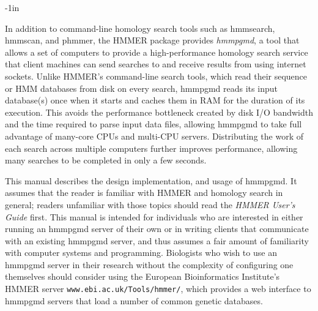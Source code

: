\documentclass[notoc]{tufte-book}    %
\begin{document}
\setcounter{tocdepth}{2}             %

\maketitle



\begin{adjustwidth}{}{-1in}          %
\tableofcontents                     
\end{adjustwidth}

In addition to command-line homology search tools such as hmmsearch, hmmscan, and phmmer, the HMMER package provides {\em hmmpgmd}, a tool that allows a set of computers to provide a high-performance homology search service that client machines can send searches to and receive results from using internet sockets.  Unlike HMMER's command-line search tools, which read their sequence or HMM databases from disk on every search, hmmpgmd reads its input database(s) once when it starts and caches them in RAM for the duration of its execution.  This avoids the performance bottleneck created by disk I/O bandwidth and the time required to parse input data files, allowing hmmpgmd to take full advantage of many-core CPUs and multi-CPU servers.  Distributing the work of each search across multiple computers further improves performance, allowing many searches to be completed in only a few seconds.

This manual describes the design implementation, and usage of hmmpgmd.  It assumes that the reader is familiar with HMMER and homology search in general; readers unfamiliar with those topics should read the {\em HMMER User's Guide} first.  This manual is intended for individuals who are interested in either running an hmmpgmd server of their own or in writing clients that communicate with an existing hmmpgmd server, and thus assumes a fair amount of familiarity with computer systems and programming.  Biologists who wish to use an hmmpgmd server in their research without the complexity of configuring one themselves should consider using the European Bioinformatics Institute's HMMER server {\tt www.ebi.ac.uk/Tools/hmmer/}, which provides a web interface to hmmpgmd servers that load a number of common genetic databases.
 
\end{document}
